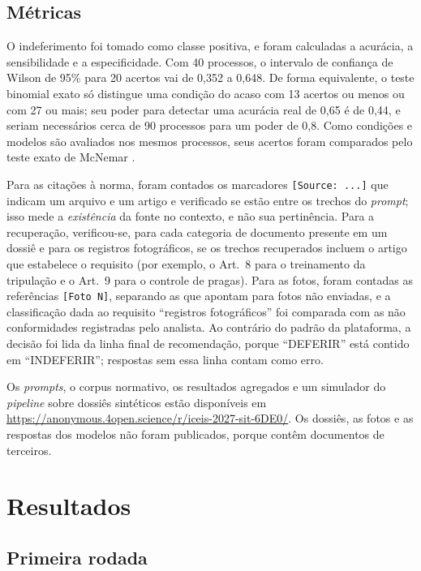 \subsection{Métricas}

O indeferimento foi tomado como classe positiva, e foram calculadas a acurácia, a sensibilidade e a especificidade. Com 40 processos, o intervalo de confiança de Wilson de 95\% \cite{Wilson1927} para 20 acertos vai de 0,352 a 0,648. De forma equivalente, o teste binomial exato só distingue uma condição do acaso com 13 acertos ou menos ou com 27 ou mais; seu poder para detectar uma acurácia real de 0,65 é de 0,44, e seriam necessários cerca de 90 processos para um poder de 0,8. Como condições e modelos são avaliados nos mesmos processos, seus acertos foram comparados pelo teste exato de McNemar \cite{McNemar1947}.

Para as citações à norma, foram contados os marcadores \texttt{[Source: ...]} que indicam um arquivo e um artigo e verificado se estão entre os trechos do \textit{prompt}; isso mede a \textit{existência} da fonte no contexto, e não sua pertinência. Para a recuperação, verificou-se, para cada categoria de documento presente em um dossiê e para os registros fotográficos, se os trechos recuperados incluem o artigo que estabelece o requisito (por exemplo, o Art.~8 para o treinamento da tripulação e o Art.~9 para o controle de pragas). Para as fotos, foram contadas as referências \texttt{[Foto~N]}, separando as que apontam para fotos não enviadas, e a classificação dada ao requisito ``registros fotográficos'' foi comparada com as não conformidades registradas pelo analista. Ao contrário do padrão da plataforma, a decisão foi lida da linha final de recomendação, porque ``DEFERIR'' está contido em ``INDEFERIR''; respostas sem essa linha contam como erro.

Os \textit{prompts}, o corpus normativo, os resultados agregados e um simulador do \textit{pipeline} sobre dossiês sintéticos estão disponíveis em \url{https://anonymous.4open.science/r/iceis-2027-sit-6DE0/}. Os dossiês, as fotos e as respostas dos modelos não foram publicados, porque contêm documentos de terceiros.

\section{Resultados}
\label{sec:resultados}

\subsection{Primeira rodada}

